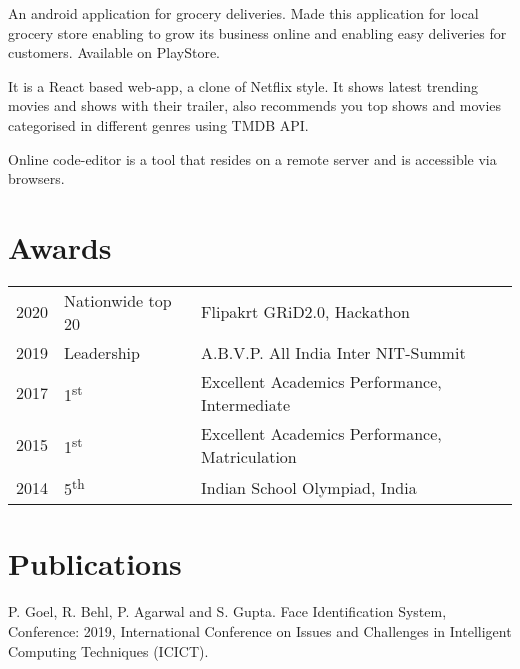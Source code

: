 \documentclass[]{deedy-resume-openfont}
\begin{document}
\begin{minipage}[t]{0.66\textwidth}
An android application for grocery deliveries. Made this application for local grocery store enabling to grow its business online and enabling easy deliveries for customers. Available on PlayStore. 
\sectionsep

 It is a React based web-app, a clone of Netflix style. It shows latest trending movies and shows with their trailer, also recommends you top shows and movies categorised in different genres using TMDB API.
\sectionsep

 Online code-editor is a tool that resides on a remote server and is accessible via browsers.
\sectionsep


\section{Awards} 
\begin{tabular}{rll}
2020	     & Nationwide top 20        & Flipakrt GRiD2.0, Hackathon\\
2019	     & Leadership               & A.B.V.P. All India Inter NIT-Summit\\
2017	     & 1\textsuperscript{st}    & Excellent Academics Performance, Intermediate\\
2015	     & 1\textsuperscript{st}    & Excellent Academics Performance, Matriculation\\
2014	     & 5\textsuperscript{th}    & Indian School Olympiad, India\\
\end{tabular}
\sectionsep


\section{Publications} 
\renewcommand\refname{\vskip -1.5em} %

P. Goel, R. Behl, P. Agarwal and S. Gupta. Face Identification System, Conference: 2019, International Conference on Issues and Challenges in Intelligent Computing Techniques (ICICT).
\nocite{*}


\end{minipage} 
\end{document}
